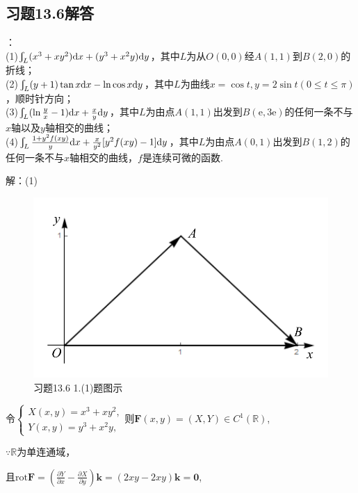 \documentclass[12pt,UTF8,fleqn]{ctexart}
\newcommand{\BLInt}[2]{\varint\nolimits_{#1}#2}
\newcommand{\md}[1]{\mathrm d#1}
\newcommand{\pp}[2]{\frac{\partial #1}{\partial #2}}
\newcommand{\me}[0]{\mathrm e}
\begin{document}
\subsection{习题13.6解答}
\begin{enumerate}
：\\
(1)$\BLInt L{(x^3+xy^2)\md x+(y^3+x^2y)\md y}$，其中$L$为从$O(0,0)$经$A(1,1)$到$B(2,0)$的折线；\\
(2)$\BLInt L{(y+1)\tan x\md x-\ln\cos x\md y}$，其中$L$为曲线$x=\cos t,y=2\sin t(0\leqslant t\leqslant\pi)$，顺时针方向；\\
(3)$\BLInt L{(\ln\frac yx-1)\md x+\frac xy\md y}$，其中$L$为由点$A(1,1)$出发到$B(\me,3\me)$的任何一条不与$x$轴以及$y$轴相交的曲线；\\
(4)$\BLInt L{\frac{1+y^2f(xy)}y\md x+\frac x{y^2}[y^2f(xy)-1]\md y}$，其中$L$为由点$A(0,1)$出发到$B(1,2)$的任何一条不与$x$轴相交的曲线，$f$是连续可微的函数.

解：(1)\begin{figure}[H]
\begin{center}
\includegraphics[height=0.2\textheight]{Figures25/Fig13-6-1-1.pdf}
\end{center}
\caption{习题13.6 1.(1)题图示}
\label{13-6-1-1}
\end{figure}

令$\begin{cases}
X(x,y)=x^3+xy^2,\\
Y(x,y)=y^3+x^2y,
\end{cases}$则$\bm F(x,y)=(X,Y)\in C^1(\mathbb R)$, 

$\because\mathbb R$为单连通域，

且$\text{rot}\bm F=(\pp Yx-\pp Xy)\bm k=(2xy-2xy)\bm k=\bm0$,


\end{enumerate}
\end{document}
